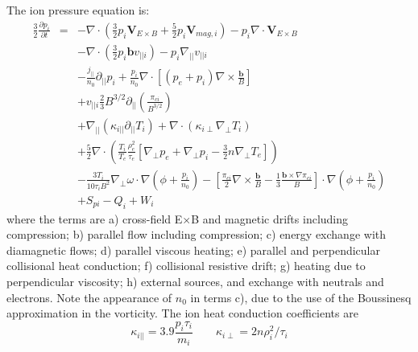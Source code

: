 \documentclass[12pt,a4paper]{article}
\begin{document}
The ion pressure equation is:
\begin{subequations}
\begin{eqnarray}
%
%
\frac{3}{2}\frac{\partial p_i}{\partial t} &=& -\nabla\cdot\left(\frac{3}{2}p_i\mathbf{V}_{E\times B} + \frac{5}{2}p_i\mathbf{V}_{mag,i}\right) - p_i\nabla\cdot\mathbf{V}_{E\times B} \\
&& -\nabla\cdot\left(\frac{3}{2}p_i\mathbf{b}v_{||i}\right)  - p_i\nabla_{||}v_{||i} \\
&& -\frac{j_{||}}{n_0}\partial_{||}p_i + \frac{p_i}{n_0}\nabla\cdot\left[\left(p_e + p_i\right)\nabla\times\frac{\mathbf{b}}{B}\right]  \\
&& + v_{||i}\frac{2}{3}B^{3/2}\partial_{||}\left(\frac{\pi_{ci}}{B^{3/2}}\right) \\
&& + \nabla_{||}\left(\kappa_{i||}\partial_{||}T_i\right) + \nabla\cdot\left(\kappa_{i\perp}\nabla_\perp T_i\right) \\
&& + \frac{5}{2}\nabla\cdot\left(\frac{T_i}{T_e}\frac{\rho_e^2}{\tau_e}\left[ \nabla_\perp p_e + \nabla_\perp p_i - \frac{3}{2}n\nabla_\perp T_e \right]\right) \\
&& - \frac{3T_i}{10\tau_iB^2}\nabla_\perp\omega\cdot\nabla\left(\phi + \frac{p_i}{n_0}\right) - \left[\frac{\pi_{ci}}{2}\nabla\times\frac{\mathbf{b}}{B} - \frac{1}{3}\frac{\mathbf{b}\times\nabla\pi_{ci}}{B}\right]\cdot\nabla\left(\phi + \frac{p_i}{n_0}\right) \\
&& + S_{pi} - Q_i + W_i
\end{eqnarray}\label{eq:ion-pressure}
\end{subequations}
where the terms are a) cross-field E$\times$B and magnetic drifts including compression; b) parallel flow including compression;
c) energy exchange with diamagnetic flows; d) parallel viscous heating; e) parallel and perpendicular collisional heat conduction; f) collisional resistive drift; g) heating due to perpendicular viscosity; h)
external sources, and exchange with neutrals and electrons. Note the appearance of $n_0$ in terms c), due to the use of the Boussinesq approximation in the vorticity.
The ion heat conduction coefficients are
\begin{equation}
  \kappa_{i||} = 3.9\frac{p_i\tau_i}{m_i} \qquad \kappa_{i\perp} = 2n\rho_i^2/\tau_i
\end{equation}
\end{document}
